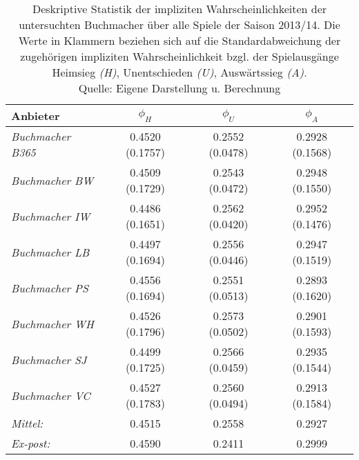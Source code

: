 \begin{table}
\centering
	\begin{tabular}{lccc}
	\toprule
	\textbf{Anbieter} & $ \phi_H $ & $ \phi_U $ & $ \phi_A $ \\
	\midrule
	\textit{Buchmacher B365} & 0.4520 (0.1757) & 0.2552 (0.0478) & 0.2928 (0.1568) \\
	\textit{Buchmacher BW} & 0.4509 (0.1729) & 0.2543 (0.0472) & 0.2948 (0.1550) \\
	\textit{Buchmacher IW} & 0.4486 (0.1651) & 0.2562 (0.0420) & 0.2952 (0.1476) \\
	\textit{Buchmacher LB} & 0.4497 (0.1694) & 0.2556 (0.0446) & 0.2947 (0.1519) \\
	\textit{Buchmacher PS} & 0.4556 (0.1694) & 0.2551 (0.0513) & 0.2893 (0.1620) \\
	\textit{Buchmacher WH} & 0.4526 (0.1796) & 0.2573 (0.0502) & 0.2901 (0.1593) \\
	\textit{Buchmacher SJ} & 0.4499 (0.1725) & 0.2566 (0.0459) & 0.2935 (0.1544) \\
	\textit{Buchmacher VC} & 0.4527 (0.1783) & 0.2560 (0.0494) & 0.2913 (0.1584) \\
	\midrule
	\textit{Mittel:} & 0.4515 & 0.2558 & 0.2927 \\
	\textit{Ex-post:} & 0.4590 & 0.2411 & 0.2999 \\
	\toprule
	\end{tabular}
	
\caption[Vergleich der impliziten Wahrscheinlichkeiten Saison 2013/14]{Deskriptive Statistik der impliziten Wahrscheinlichkeiten der untersuchten Buchmacher über alle Spiele der Saison 2013/14. Die Werte in Klammern beziehen sich auf die Standardabweichung der zugehörigen impliziten Wahrscheinlichkeit bzgl. der Spielausgänge Heimsieg \textit{(H)}, Unentschieden \textit{(U)}, Auswärtssieg \textit{(A)}. \\ Quelle: Eigene Darstellung u. Berechnung}
\label{tab:statistik:impliziteWKeit}
\end{table}

